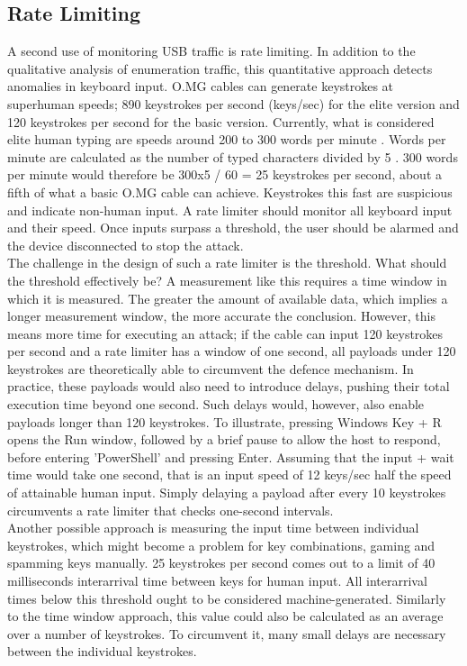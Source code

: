 \subsection{Rate Limiting}

A second use of monitoring USB traffic is rate limiting. In addition to the qualitative analysis of enumeration traffic, this quantitative approach detects anomalies in keyboard input. O.MG cables can generate keystrokes at superhuman speeds; 890 keystrokes per second (keys/sec) for the elite version and 120 keystrokes per second for the basic version. Currently, what is considered elite human typing are speeds around 200 to 300 words per minute \cite{mythicalrocketTYPING305WPM2023}. Words per minute are calculated as the number of typed characters divided by 5 \cite{travisWhatWordsMinute2015}. 300 words per minute would therefore be 300x5 / 60 = 25 keystrokes per second, about a fifth of what a basic O.MG cable can achieve.
Keystrokes this fast are suspicious and indicate non-human input. A rate limiter should monitor all keyboard input and their speed. Once inputs surpass a threshold, the user should be alarmed and the device disconnected to stop the attack. \\
The challenge in the design of such a rate limiter is the threshold. What should the threshold effectively be? A measurement like this requires a time window in which it is measured. The greater the amount of available data, which implies a longer measurement window, the more accurate the conclusion. However, this means more time for executing an attack; if the cable can input 120 keystrokes per second and a rate limiter has a window of one second, all payloads under 120 keystrokes are theoretically able to circumvent the defence mechanism. In practice, these payloads would also need to introduce delays, pushing their total execution time beyond one second.
Such delays would, however, also enable payloads longer than 120 keystrokes. To illustrate, pressing Windows Key + R opens the Run window, followed by a brief pause to allow the host to respond, before entering 'PowerShell' and pressing Enter. Assuming that the input + wait time would take one second, that is an input speed of 12 keys/sec half the speed of attainable human input. Simply delaying a payload after every 10 keystrokes circumvents a rate limiter that checks one-second intervals.\\
Another possible approach is measuring the input time between individual keystrokes, which might become a problem for key combinations, gaming and spamming keys manually. 25 keystrokes per second comes out to a limit of 40 milliseconds interarrival time between keys for human input. All interarrival times below this threshold ought to be considered machine-generated. Similarly to the time window approach, this value could also be calculated as an average over a number of keystrokes. To circumvent it, many small delays are necessary between the individual keystrokes.\\
